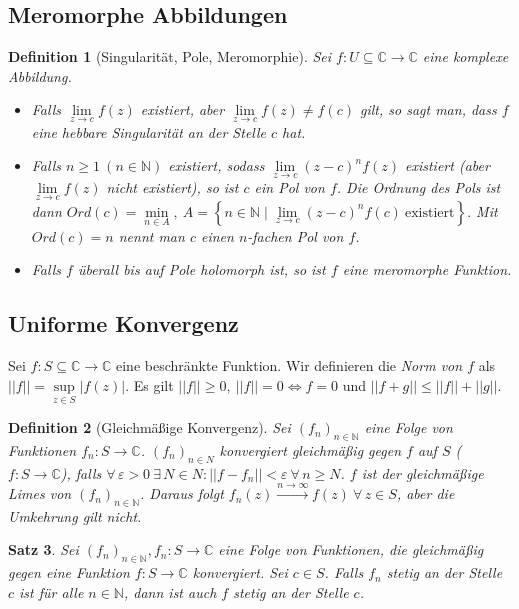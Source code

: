 \documentclass[a4paper,12pt]{article}
\renewcommand{\epsilon}{\varepsilon}
\theoremstyle{newthm}
\newtheorem{thm}{Satz}[subsection]
\theoremstyle{newdef}
\newtheorem{defn}[thm]{Definition}
\theoremstyle{newrem}
\newcommand{\N}{\mathbb{N}}
\newcommand{\C}{\mathbb{C}}
\begin{document}
	
	\subsection{Meromorphe Abbildungen}
		
		\begin{defn}[Singularität, Pole, Meromorphie]
			Sei $ f : U \subseteq \C \to \C $ eine komplexe Abbildung.
			\begin{itemize}
				\item Falls $ \lim\limits_{z \to c} f(z) $ existiert, aber $ \lim\limits_{z \to c} f(z) \neq f(c) $ gilt, so sagt man, dass $f$ eine \emph{hebbare Singularität} an der Stelle $c$ hat. 
				\item Falls $ n \geq 1\ (n \in \N) $ existiert, sodass $ \lim\limits_{z \to c} (z-c)^n f(z) $ existiert (aber $ \lim\limits_{z \to c} f(z) $ nicht existiert), so ist $c$ ein \emph{Pol} von $f$. Die \emph{Ordnung des Pols} ist dann $ Ord(c) = \min\limits_{n \in A},\ A = \left\{ n \in \N \mid \lim\limits_{z \to c}(z-c)^nf(c)\ \text{existiert} \right\}. $ Mit $ Ord(c) = n $ nennt man $c$ einen $n$-fachen Pol von $f$.
				\item Falls $ f $ überall bis auf Pole holomorph ist, so ist $f$ eine \emph{meromorphe Funktion}.
			\end{itemize}
		\end{defn}
		
	
	\subsection{Uniforme Konvergenz}
		
		Sei $ f: S \subseteq \C \to \C $ eine beschränkte Funktion. Wir definieren die \emph{Norm von $f$} als $ ||f||=\sup\limits_{z \in S} |f(z)| $. Es gilt $ ||f|| \geq 0,\ ||f||=0 \iff f=0 $ und $ ||f+g|| \leq ||f||+||g|| $. 
		
		\begin{defn}[Gleichmäßige Konvergenz]
			Sei $ (f_n)_{n \in \N} $ eine Folge von Funktionen $ f_n: S \to \C $. $ (f_n)_{n \in N} $ \emph{konvergiert gleichmäßig} gegen $f$ auf $S$ ($ f: S \to \C $), falls $ \forall\, \epsilon > 0 \ \exists\, N \in N: ||f-f_n|| < \epsilon \ \forall\, n \geq N $. $f$ ist der gleichmäßige Limes von $ (f_n)_{n \in \N} $. Daraus folgt $ f_n(z) \overset{n \to \infty}{\longrightarrow} f(z) \ \forall\, z \in S $, aber die Umkehrung gilt nicht.
		\end{defn}
		
		\begin{thm}
			Sei $ (f_n)_{n \in \N}, f_n:S \to \C $ eine Folge von Funktionen, die gleichmäßig gegen eine Funktion $ f: S \to \C $ konvergiert. Sei $c \in S$. Falls $ f_n $ stetig an der Stelle $c$ ist für alle $n \in \N$, dann ist auch $f$ stetig an der Stelle $c$. 
		\end{thm}
		
\end{document}
